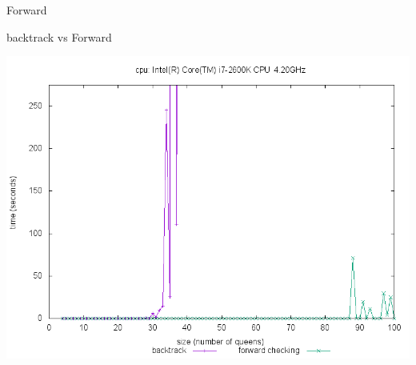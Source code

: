 \documentclass[10pt,a4paper]{beamer}
\begin{document}
\begin{frame}
\begin{block}{Forward}
	\end{block}

	\begin{block}{backtrack vs Forward}

	\includegraphics[width=1\textwidth]{images/plot_bt_fw_i7.png}

	\end{block}



\end{frame}
\end{document}
